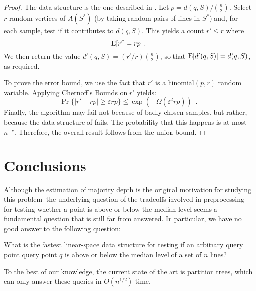 \documentclass{patmorin}
\newcommand{\eps}{\varepsilon}
\begin{document}
\begin{proof}
  The data structure is the one described in .
  Let $p=d(q,S)/\binom{n}{2}$.  Select $r$ random vertices of $A(S^*)$
  (by taking random pairs of lines in $S^*$) and, for each sample, test
  if it contributes to $d(q,S)$.  This yields a count $r' \le r$ where
  \[ 
     \mathrm{E}[r'] = rp \enspace .
  \]
  We then return the value $d'(q,S)=(r'/r)\binom{n}{2}$, so that
  $\mathrm{E}[d'(q,S)]=d(q,S)$, as required.

  To prove the error bound, we use the fact that $r'$ is a binomial$(p,r)$
  random variable.  Applying Chernoff's Bounds on $r'$ yields:
  \[
     \Pr\{|r' - rp| \ge \eps rp\} \le \exp(-\Omega(\eps^2rp)) \enspace .
  \]
  Finally, the algorithm may fail not because of badly chosen samples,
  but rather, because the data structure of  fails.
  The probability that this happens is at most $n^{-c}$. Therefore,
  the overall result follows from the union bound.
\end{proof}

\section{Conclusions}

Although the estimation of majority depth is the original motivation for
studying this problem, the underlying question of the tradeoffs involved
in preprocessing for testing whether a point is above or below the median
level seems a fundamental question that is still far from answered.  In particular, we have no good answer to the following question:

\begin{op}
What is the fastest linear-space data structure for testing if an
arbitrary query point query point $q$ is above or below the median level
of a set of $n$ lines?
\end{op}

To the best of our knowledge, the current state of the art is partition
trees, which can only answer these queries in $O(n^{1/2})$ time.



\end{document}

